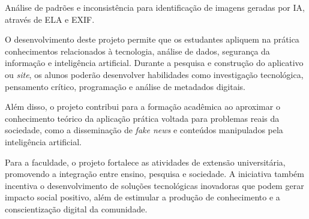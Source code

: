 Análise de padrões e inconsistência para identificação de imagens geradas por IA,
através de ELA e EXIF.

O desenvolvimento deste projeto permite que os estudantes apliquem na prática
conhecimentos relacionados à tecnologia, análise de dados, segurança da
informação e inteligência artificial. Durante a pesquisa e construção do
aplicativo ou \textit{site}, os alunos poderão desenvolver habilidades como
investigação tecnológica, pensamento crítico, programação e análise de metadados
digitais.

Além disso, o projeto contribui para a formação acadêmica ao aproximar o
conhecimento teórico da aplicação prática voltada para problemas reais da
sociedade, como a disseminação de \textit{fake news} e conteúdos manipulados pela
inteligência artificial.

Para a faculdade, o projeto fortalece as atividades de extensão universitária,
promovendo a integração entre ensino, pesquisa e sociedade. A iniciativa também
incentiva o desenvolvimento de soluções tecnológicas inovadoras que podem gerar
impacto social positivo, além de estimular a produção de conhecimento e a
conscientização digital da comunidade.

